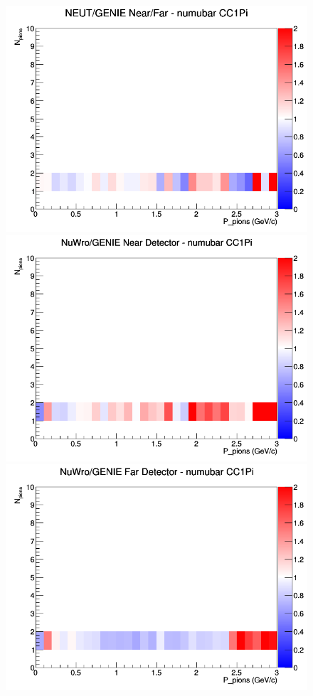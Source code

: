 \documentclass[12pt]{article}
\begin{document}
\begin{figure}[h]
\endminipage
{}
\includegraphics[width=\linewidth]{N_P/nominal/pions/ratios/CC1Pi_NEUT_GENIE_numubar_NF_N_P.png}
\endminipage
\newline
{}
\includegraphics[width=\linewidth]{N_P/nominal/pions/ratios/CC1Pi_NuWro_GENIE_numubar_near_N_P.png}
\endminipage
{}
\includegraphics[width=\linewidth]{N_P/nominal/pions/ratios/CC1Pi_NuWro_GENIE_numubar_far_N_P.png}

\end{figure}
\end{document}
